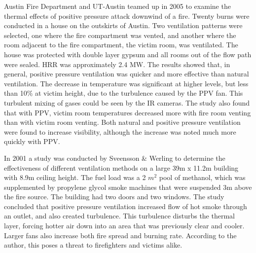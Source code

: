 \documentclass{article}
\begin{document}
Austin Fire Department and UT-Austin teamed up in 2005 to examine the thermal effects of positive pressure attack downwind of a fire. Twenty burns were conducted in a house on the outskirts of Austin. Two ventilation patterns were selected, one where the fire compartment was vented, and another where the room adjacent to the fire compartment, the victim room, was ventilated. The house was protected with double layer gypsum and all rooms out of the flow path were sealed. HRR was approximately 2.4 MW. The results showed that, in general, positive pressure ventilation was quicker and more effective than natural ventilation. The decrease in temperature was significant at higher levels, but less than 10\% at victim height, due to the turbulence caused by the PPV fan. This turbulent mixing of gases could be seen by the IR cameras. The study also found that with PPV, victim room temperatures decreased more with fire room venting than with victim room venting. Both natural and positive pressure ventilation were found to increase visibility, although the increase was noted much more quickly with PPV. \cite{Lakshmin}

In 2001 a study was conducted by Sveensson \& Werling to determine the effectiveness of different ventilation methods on a large 39m x 11.2m building with 8.9m ceiling height. The fuel load was a 2 $m^{2}$ pool of methanol, which was supplemented by propylene glycol smoke machines that were suspended 3m above the fire source.  The building had two doors and two windows. The study concluded that positive pressure ventilation increased flow of hot smoke through an outlet, and also created turbulence. This turbulence disturbs the thermal layer, forcing hotter air down into an area that was previously clear and cooler. Larger fans also increase both fire spread and burning rate. According to the author, this poses a threat to firefighters and victims alike.\cite{SvenssonFireVentinLargeFireHall}
\end{document}
